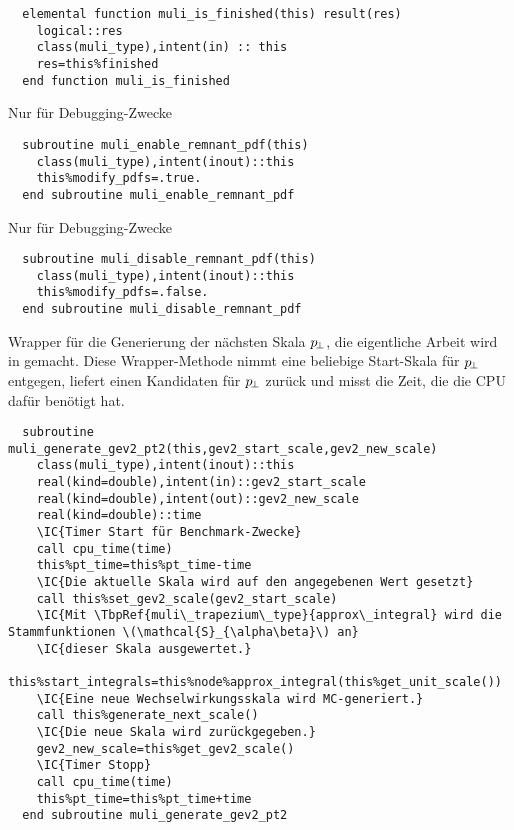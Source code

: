 \begin{Verbatim}
  elemental function muli_is_finished(this) result(res)
    logical::res
    class(muli_type),intent(in) :: this
    res=this%finished
  end function muli_is_finished
\end{Verbatim}

Nur für Debugging-Zwecke
\begin{Verbatim}
  subroutine muli_enable_remnant_pdf(this)
    class(muli_type),intent(inout)::this
    this%modify_pdfs=.true.
  end subroutine muli_enable_remnant_pdf
\end{Verbatim}

Nur für Debugging-Zwecke
\begin{Verbatim}
  subroutine muli_disable_remnant_pdf(this)
    class(muli_type),intent(inout)::this
    this%modify_pdfs=.false.
  end subroutine muli_disable_remnant_pdf
\end{Verbatim}

Wrapper für die Generierung der nächsten Skala $p_{\!\perp}$, die eigentliche Arbeit wird in  gemacht. Diese Wrapper-Methode nimmt eine beliebige Start-Skala für $p_{\!\perp}$ entgegen, liefert einen Kandidaten für $p_{\!\perp}$ zurück und misst die Zeit, die die CPU dafür benötigt hat.
\begin{Verbatim}
  subroutine muli_generate_gev2_pt2(this,gev2_start_scale,gev2_new_scale)
    class(muli_type),intent(inout)::this
    real(kind=double),intent(in)::gev2_start_scale
    real(kind=double),intent(out)::gev2_new_scale
    real(kind=double)::time
    \IC{Timer Start für Benchmark-Zwecke}
    call cpu_time(time)
    this%pt_time=this%pt_time-time
    \IC{Die aktuelle Skala wird auf den angegebenen Wert gesetzt}
    call this%set_gev2_scale(gev2_start_scale)
    \IC{Mit \TbpRef{muli\_trapezium\_type}{approx\_integral} wird die Stammfunktionen \(\mathcal{S}_{\alpha\beta}\) an}
    \IC{dieser Skala ausgewertet.}
    this%start_integrals=this%node%approx_integral(this%get_unit_scale())
    \IC{Eine neue Wechselwirkungsskala wird MC-generiert.}
    call this%generate_next_scale()
    \IC{Die neue Skala wird zurückgegeben.}
    gev2_new_scale=this%get_gev2_scale()
    \IC{Timer Stopp}
    call cpu_time(time)
    this%pt_time=this%pt_time+time
  end subroutine muli_generate_gev2_pt2
\end{Verbatim}
  
